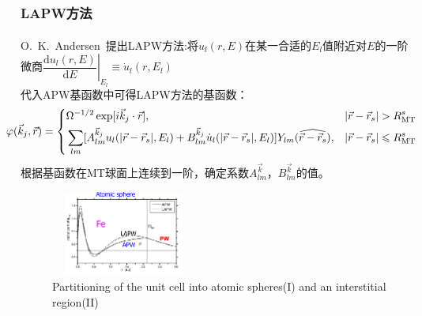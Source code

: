 \documentclass[cjk,slidestop,compress,mathserif,blue]{beamer}
\newcommand{\upcite}[1]{\hspace{0ex}\textsuperscript{\cite{#1}}} %
\begin{document}
\frame
{
\frametitle{\textrm{LAPW}方法}
\textrm{O.~K.~Andersen~}提出\textrm{LAPW}方法\upcite{Singh}:将$u_l(r,E)$在某一合适的$E_l$值附近对$E$的一阶微商{$\left.\dfrac{\textrm{d}u_l(r,E)}{\textrm{d}E}\right|_{E_l}\equiv\dot u_l(r,E_l)$}\\代入\textrm{APW}基函数中可得\textrm{LAPW}方法的基函数：
{\fontsize{7.5pt}{3.3pt}\selectfont
$$\hskip -14pt \varphi(\vec k_j,\vec r)=\left\{
  \begin{aligned}
    &\Omega^{-1/2}\exp[i\vec k_j\cdot\vec r],&|\vec r-\vec r_s|>R_{\mathrm{MT}}^s\\
    &\sum_{lm}[A^{\vec k_j}_{lm}u_l(|\vec r-\vec r_s|,E_l)+B^{\vec k_j}_{lm}\dot u_l(|\vec r-\vec r_s|,E_l)]Y_{lm}(\widehat{\vec r-\vec r_s}),&|\vec r-\vec r_s|\leqslant R_{\mathrm{MT}}^s
  \end{aligned}
\right.$$
根据基函数在\textrm{MT}球面上连续到一阶，确定系数$A^{\vec k}_{lm}$，$B^{\vec k}_{lm}$的值。}
\begin{figure}[h!]
	\vskip -3pt
\centering
\includegraphics[height=1.10in,width=1.88in,viewport=1 20 585 435,clip]{Figures/WIEN2k-LAPW.png}
\caption{\tiny \textrm{Partitioning of the unit cell into atomic spheres(I) and an interstitial region(II)}}%
\label{Muffin_tin-3}
\end{figure}
}
\end{document}
